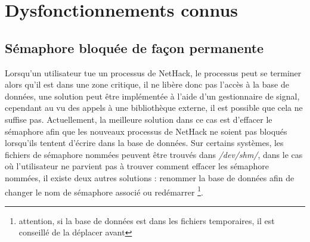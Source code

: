 \documentclass[10pt,a4paper]{report}
\begin{document}
\chapter{Dysfonctionnements connus}
\section{Sémaphore bloquée de façon permanente}
Lorsqu'un utilisateur tue un processus de NetHack, le processus peut se terminer
alors qu'il est dans une zone critique, il ne libère donc pas l'accès à la base
de données, une solution peut être implémentée à l'aide d'un gestionnaire de
signal, cependant au vu des appels à une bibliothèque externe, il est possible
que cela ne suffise pas. Actuellement, la meilleure solution dans ce cas est
d'effacer le sémaphore afin que les nouveaux processus de NetHack ne soient pas
bloqués lorsqu'ils tentent d'écrire dans la base de données. Sur certains
systèmes, les fichiers de sémaphore nommées peuvent être trouvés dans 
\emph{/dev/shm/}, dans le cas où l'utilisateur ne parvient pas à trouver
comment effacer les sémaphore nommées, il existe deux autres solutions :
renommer la base de données afin de changer le nom de sémaphore associé ou
redémarrer \footnote{attention, si la base de données est dans les fichiers
temporaires, il est 
conseillé de la déplacer avant}.
\end{document}
